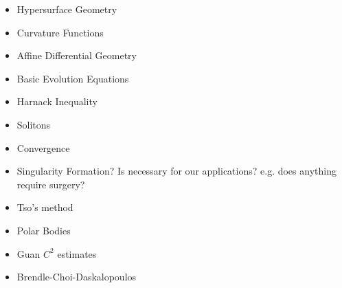 \begin{itemize}
\item Hypersurface Geometry
\item Curvature Functions
\item Affine Differential Geometry
\item Basic Evolution Equations
\item Harnack Inequality
\item Solitons
\item Convergence
\item Singularity Formation? Is necessary for our applications? e.g. does anything require surgery?
\item Tso's method
\item Polar Bodies
\item Guan $C^2$ estimates
\item Brendle-Choi-Daskalopoulos
\end{itemize}